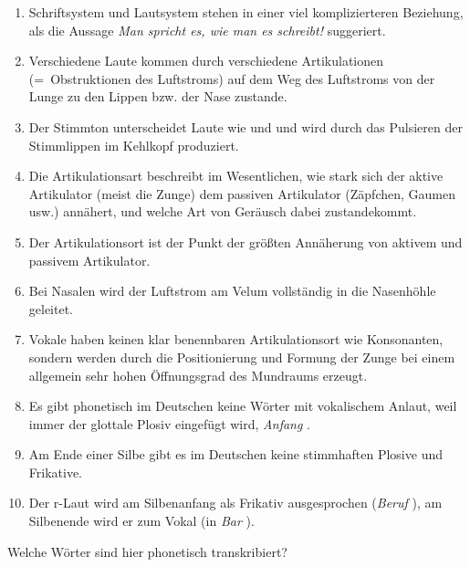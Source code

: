 \begin{enumerate}
  \item Schriftsystem und Lautsystem stehen in einer viel komplizierteren Beziehung, als die Aussage \textit{Man spricht es, wie man es schreibt!} suggeriert.
  \item Verschiedene Laute kommen durch verschiedene Artikulationen (=~Obstruktionen des Luftstroms) auf dem Weg des Luftstroms von der Lunge zu den Lippen bzw. der Nase zustande.
  \item Der Stimmton unterscheidet Laute wie \textipa{[t]} und \textipa{[d]} und wird durch das Pulsieren der Stimmlippen im Kehlkopf produziert.
  \item Die Artikulationsart beschreibt im Wesentlichen, wie stark sich der aktive Artikulator (meist die Zunge) dem passiven Artikulator (Zäpfchen, Gaumen usw.) annähert, und welche Art von Geräusch dabei zustandekommt.
  \item Der Artikulationsort ist der Punkt der größten Annäherung von aktivem und passivem Artikulator.
  \item Bei Nasalen wird der Luftstrom am Velum vollständig in die Nasenhöhle geleitet.
  \item Vokale haben keinen klar benennbaren Artikulationsort wie Konsonanten, sondern werden durch die Positionierung und Formung der Zunge bei einem allgemein sehr hohen Öffnungsgrad des Mundraums erzeugt.
  \item Es gibt phonetisch im Deutschen keine Wörter mit vokalischem Anlaut, weil immer der glottale Plosiv \textipa{[P]} eingefügt wird, \zB \textit{Anfang} \textipa{[PanfaN]}.
  \item Am Ende einer Silbe gibt es im Deutschen keine stimmhaften Plosive und Frikative.
  \item Der r-Laut wird am Silbenanfang als Frikativ ausgesprochen (\zB \textit{Beruf} \textipa{[b@Ku:f]}), am Silbenende wird er zum Vokal (\zB in \textit{Bar} \textipa{[b\t{a@}]}).
\end{enumerate}

\Uebungen

\Uebung[\onestar] \label{u31} Welche Wörter sind hier phonetisch transkribiert?

